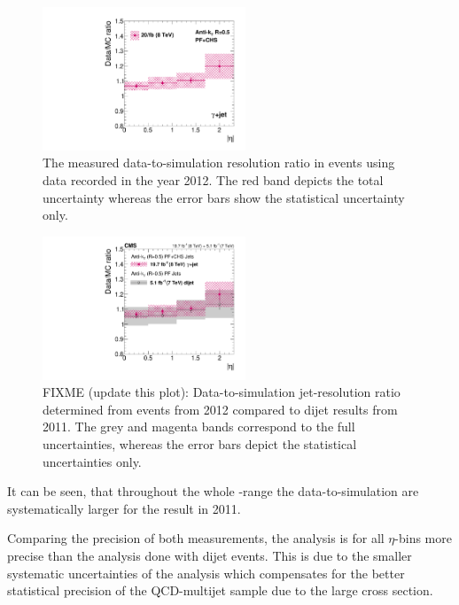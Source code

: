 \begin{figure}[!t]
 \centering
    \includegraphics[width=0.54\textwidth]{figures/resolution/results/MySingleFinalResult.pdf}
  \caption{The measured data-to-simulation resolution ratio in \GAMJET events using data recorded in the year 2012.
           The red band depicts the total uncertainty whereas the error bars show the statistical uncertainty only.}
  \label{res:fig:RatioFinal}
\end{figure}
\begin{figure}[!t]
 \centering
    \includegraphics[width=0.54\textwidth]{figures/resolution/results/Figure_43_left_Teresa_cmsStyle_updated_5.pdf}
  \caption{FIXME (update this plot): Data-to-simulation jet-\pt resolution ratio determined from \GAMJET events from 2012 compared to dijet results from 2011.
           The grey and magenta bands correspond to the full uncertainties, whereas the error bars depict the statistical uncertainties only.}
  \label{res:fig:Comparison_2011}
\end{figure}

It can be seen, that throughout the whole \etajet-range the data-to-simulation are systematically larger for the result in 2011. 

Comparing the precision of both measurements, the \GAMJET analysis is for all $\eta$-bins more precise than the analysis done with dijet events.
This is due to the smaller systematic uncertainties of the \GAMJET analysis which compensates for the better statistical precision of the QCD-multijet sample due to the large cross section.


